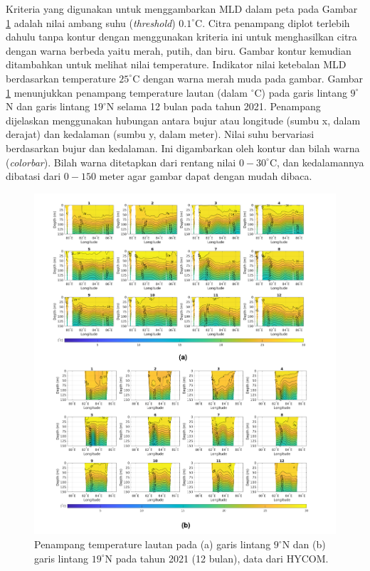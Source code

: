 \begin{spacing}{1.5}
	Kriteria yang digunakan untuk menggambarkan MLD dalam peta pada Gambar \ref{fig:mld} adalah nilai ambang suhu (\textit{threshold}) $0.1^\circ$C. Citra penampang diplot terlebih dahulu tanpa kontur dengan menggunakan kriteria ini untuk menghasilkan citra dengan warna berbeda yaitu merah, putih, dan biru. Gambar kontur kemudian ditambahkan untuk melihat nilai temperature. Indikator nilai ketebalan MLD berdasarkan temperature $25^\circ$C dengan warna merah muda pada gambar. Gambar \ref{fig:mld} menunjukkan penampang temperature lautan (dalam $^\circ$C) pada garis lintang $9^\circ$N dan garis lintang $19^\circ$N selama 12 bulan pada tahun 2021. Penampang dijelaskan menggunakan hubungan antara bujur atau longitude (sumbu x, dalam derajat) dan kedalaman (sumbu y, dalam meter). Nilai suhu bervariasi berdasarkan bujur dan kedalaman. Ini digambarkan oleh kontur dan bilah warna (\textit{colorbar}). Bilah warna ditetapkan dari rentang nilai $0 - 30^\circ$C, dan kedalamannya dibatasi dari $0-150$ meter agar gambar dapat dengan mudah dibaca.
	
	\begin{figure}[H]
		\centering
		\includegraphics[width=16cm]{contents/final_figure/Figure_4}
		\caption{Penampang temperature lautan pada (a) garis lintang $9^\circ$N dan (b) garis lintang $19^\circ$N pada tahun 2021 (12 bulan), data dari HYCOM.}
		\label{fig:mld}
	\end{figure}
	

\end{spacing}
